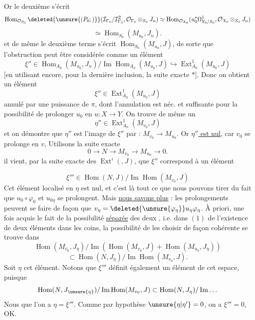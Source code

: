 Or le  deuxième  s'écrit
\[
\operatorname{Hom}_{\mathcal{O}_{P_0}}\deleted{\unsure{(P_0;)}}
(\mathcal{I}_{\Gamma_0}/\mathcal{I}_{\Gamma_0}^{2},\mathcal{O}_{\Gamma_0}\otimes_{S_0}J_n)
\simeq\operatorname{Hom}_{\mathcal{O}_{X_0}}(u_0^*\Omega^1_{Y_0/S_0},\mathcal{O}_{X_0}\otimes_{S_0}J_n)
\]
\[
\simeq\operatorname{Hom}_{S_0}(M_{u_0},J_n).
\]
et de même le deuxième terme s'écrit
$\operatorname{Hom}_{S_0}(M_{u_0},J)$, de sorte que l'obstruction
peut être considérée comme un élément
\[
\xi''\in\operatorname{Hom}_{A_0}(M_{u_0},J_n)/\operatorname{Im}\operatorname{Hom}_{A_0}(M_{u_0},J)
\hookrightarrow\operatorname{Ext}^{1}_{A_0}(M_{u_0},J)
\]
[en utilisant encore, pour la dernière inclusion,
la suite exacte $*$]. Donc on obtient un
élément
\[
\xi''\in\operatorname{Ext}^{1}_{A_0}(M_{u_0},J)
\]
annulé par une puissance de $\pi$, dont l'annulation
est néc. et suffisante pour la possibilité de
prolonger $u_0$ en $u:X\longrightarrow Y$. On trouve de
même un
\[
\eta''\in\operatorname{Ext}^{1}_{A_0}(M_{v_0},J)
\]
et on démontre que $\eta''$ est l'image de $\xi''$
par : $M_{v_0}\longrightarrow M_{u_0}$. Or \uline{$\eta''$ est nul}, car
$v_0$ se prolonge en $v$,  Utilisons la suite exacte
\[
0\longrightarrow N\longrightarrow M_{v_0}\longrightarrow M_{u_0}\longrightarrow0.
\]
il vient, par la suite exacte des $\operatorname{Ext}^{i}(,J)$, que
$\xi''$ correspond à un élément

\[
\xi'''\in\operatorname{Hom}(N,J)/\operatorname{Im}\operatorname{Hom}(M_{v_0},J)
\]
 Cet élément localisé en $\eta$ est nul,  et
c'est là tout ce que nous pouvons tirer du
fait que $u_0\circ\varphi_0$ et $u_{0\eta}$ se prolongent. Mais
\uline{nous savons plus} : les prolongements  peuvent se faire
de façon que $v_\eta=\deleted{\unsure{\varphi_\eta}}u_\eta\varphi_\eta$. À priori,
 une fois acquis le fait de la possibilité
\uline{séparée} des deux , i.e. dans $(1)$
de l'existence de deux éléments dans les
coins, la \inserted{$\unsure{\Rightarrow}$} possibilité de les choisir de
façon cohérente se trouve dans
\[
\operatorname{Hom}(M_{v_0},J_\eta)/\operatorname{Im}
(\operatorname{Hom}(M_{v_0},J)+\operatorname{Hom}(M_{u_0},J_\eta))
\]
\[
\subset\operatorname{Hom}(N,J_\eta)/\operatorname{Im}\operatorname{Hom}(M_{v_0},J).
\]
Soit $\eta$ cet élément. Notons que $\xi'''$ définit
également un élément de cet espace,
puisque
\[
\operatorname{Hom}(N,J_{\unsure{\eta}})/\operatorname{Im}\operatorname{Hom}(M_{v_0},J)
\subset\operatorname{Hom}(N,J_\eta)/\operatorname{Im}\ldots
\]
Nous  que l'on a $\eta=\xi'''$. Comme
par hypothèse $\unsure{\eta|\eta'}=0$, on a $\xi'''=0$, OK.

